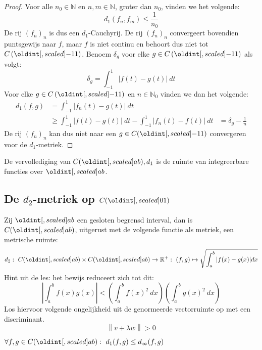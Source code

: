 \documentclass[main.tex]{subfiles}
\begin{document}
\begin{vb}
\begin{proof}
    Voor alle $n_{0}\in \mathbb{N}$ en $n,m\in \mathbb{N}$, groter dan $n_{0}$, vinden we het volgende:
    \[ d_{1}(f_{n},f_{m}) \le \frac{1}{n_{0}} \]
    De rij $(f_{n})_{n}$ is dus een $d_{1}$-Cauchyrij.
    De rij $(f_{n})_{n}$ convergeert bovendien puntsgewijs naar $f$, maar $f$ is niet continu en behoort dus niet tot $C\left(\interval{-1}{1}\right)$.
    Benoem $\delta_{g}$ voor elke $g\in C\left(\interval{-1}{1}\right)$ als volgt:
    \[ \delta_{g} = \int_{-1}^{1}|f(t)-g(t)|\ dt \]
    Voor elke $g\in C\left(\interval{-1}{1}\right)$ en $n\in\mathbb{N}_{0}$ vinden we dan het volgende:
    \begin{align*}
      d_{1}(f,g)
      &= \int_{-1}^{1}|f_{n}(t)-g(t)|\ dt\\
      &\ge \int_{-1}^{1}|f(t)-g(t)|\ dt-\int_{-1}^{1}|f_{n}(t)-f(t)|\ dt
      &= \delta_{g}-\frac{1}{n}
    \end{align*}
    De rij $(f_{n})_{n}$ kan dus niet naar een $g\in C(\interval{-1}{1})$ convergeren voor de $d_{1}$-metriek.
  \end{proof}
\end{vb}

\begin{vb}
  De vervollediging van $C(\interval{a}{b}),d_{1}$ is de ruimte van integreerbare functies over $\interval{a}{b}$.
\end{vb}

\subsection{De $d_2$-metriek op $C(\interval{0}{1})$}
\label{sec:de-d_2-metriek}

\begin{vb}
  Zij $\interval{a}{b}$ een gesloten begrensd interval, dan is $C(\interval{a}{b})$, uitgerust met de volgende functie als metriek, een metrische ruimte:
  \[ d_{2}:\ C(\interval{a}{b})\times C(\interval{a}{b}) \rightarrow \mathbb{R}^{+}:\ (f,g) \mapsto \sqrt{\int_{a}^{b}|f(x)-g(x)|dx} \]
  Hint uit de les: het bewijs reduceert zich tot dit:
  \[ \left|\int_{a}^{b}f(x)g(x)\right| < \left(\int_{a}^{b}f(x)^{2}\ dx \right) \left(\int_{a}^{b}g(x)^{2}\ dx \right) \]
  Los hiervoor volgende ongelijkheid uit de genormeerde vectorruimte op met een discriminant.
  \[ \left\| v+\lambda w \right\| > 0 \]
\end{vb}

\begin{st}
  $\forall f,g \in C(\interval{a}{b}):\ d_{1}(f,g) \le d_{\infty}(f,g)$
\end{st}
\end{document}
